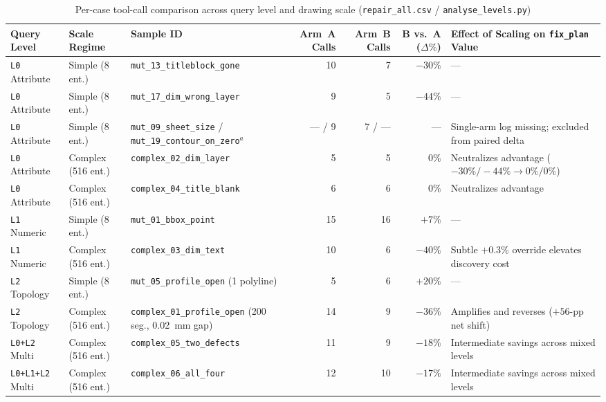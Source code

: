 \documentclass[nocopyright,nolists,upint,varvw,hyphenate]{asmejour}
\begin{document}
\begin{table}[t]
\caption{Per-case tool-call comparison across query level and drawing scale (\texttt{repair\_all.csv} / \texttt{analyse\_levels.py})}\label{tab:supp_scale_level_calls}
\centering
\scriptsize
\setlength{\tabcolsep}{2.5pt}
\begin{minipage}{\textwidth}
%
\begin{tabularx}{\textwidth}{L{1.85cm} L{2.05cm} L{3.45cm} r r r Y}
\toprule
Query Level & Scale Regime & Sample ID & Arm~A Calls & Arm~B Calls & B vs.\ A ($\Delta\%$) & Effect of Scaling on \texttt{fix\_plan} Value \\
\midrule
\texttt{L0} Attribute & Simple (8 ent.) & \texttt{mut\_13\_titleblock\_gone} & 10 & 7 & $-30\%$ & --- \\
\texttt{L0} Attribute & Simple (8 ent.) & \texttt{mut\_17\_dim\_wrong\_layer} & 9 & 5 & $-44\%$ & --- \\
\texttt{L0} Attribute & Simple (8 ent.) & \texttt{mut\_09\_sheet\_size} / \texttt{mut\_19\_contour\_on\_zero}$^{a}$ & --- / 9 & 7 / --- & --- & Single-arm log missing; excluded from paired delta \\
\texttt{L0} Attribute & Complex (516 ent.) & \texttt{complex\_02\_dim\_layer} & 5 & 5 & $0\%$ & Neutralizes advantage ($-30\%/-44\% \to 0\%/0\%$) \\
\texttt{L0} Attribute & Complex (516 ent.) & \texttt{complex\_04\_title\_blank} & 6 & 6 & $0\%$ & Neutralizes advantage \\
\midrule
\texttt{L1} Numeric & Simple (8 ent.) & \texttt{mut\_01\_bbox\_point} & 15 & 16 & $+7\%$ & --- \\
\texttt{L1} Numeric & Complex (516 ent.) & \texttt{complex\_03\_dim\_text} & 10 & 6 & $-40\%$ & Subtle $+0.3\%$ override elevates discovery cost \\
\midrule
\texttt{L2} Topology & Simple (8 ent.) & \texttt{mut\_05\_profile\_open} (1 polyline) & 5 & 6 & $+20\%$ & --- \\
\texttt{L2} Topology & Complex (516 ent.) & \texttt{complex\_01\_profile\_open} (200 seg., 0.02~mm gap) & 14 & 9 & $-36\%$ & Amplifies and reverses ($+56$-pp net shift) \\
\midrule
\texttt{L0+L2} Multi & Complex (516 ent.) & \texttt{complex\_05\_two\_defects} & 11 & 9 & $-18\%$ & Intermediate savings across mixed levels \\
\texttt{L0+L1+L2} Multi & Complex (516 ent.) & \texttt{complex\_06\_all\_four} & 12 & 10 & $-17\%$ & Intermediate savings across mixed levels \\

\end{tabularx}
\end{minipage}
\end{table}
\end{document}
